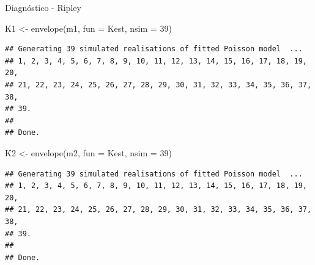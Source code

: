 \documentclass[
  11pt,
  ignorenonframetext,
]{beamer}
\newenvironment{Shaded}{}{}
\newcommand{\AttributeTok}[1]{\textcolor[rgb]{0.49,0.56,0.16}{#1}}
\newcommand{\DecValTok}[1]{\textcolor[rgb]{0.25,0.63,0.44}{#1}}
\newcommand{\FunctionTok}[1]{\textcolor[rgb]{0.02,0.16,0.49}{#1}}
\newcommand{\NormalTok}[1]{#1}
\newcommand{\OtherTok}[1]{\textcolor[rgb]{0.00,0.44,0.13}{#1}}
\begin{document}
\begin{frame}[fragile]{Diagnóstico - Ripley}
\protect\hypertarget{diagnuxf3stico---ripley}{}
\begin{Shaded}
\begin{Highlighting}[]
\NormalTok{K1 }\OtherTok{\textless{}{-}} \FunctionTok{envelope}\NormalTok{(m1, }\AttributeTok{fun =}\NormalTok{ Kest, }\AttributeTok{nsim =} \DecValTok{39}\NormalTok{)}
\end{Highlighting}
\end{Shaded}

\begin{verbatim}
## Generating 39 simulated realisations of fitted Poisson model  ...
## 1, 2, 3, 4, 5, 6, 7, 8, 9, 10, 11, 12, 13, 14, 15, 16, 17, 18, 19, 20,
## 21, 22, 23, 24, 25, 26, 27, 28, 29, 30, 31, 32, 33, 34, 35, 36, 37, 38, 
## 39.
## 
## Done.
\end{verbatim}

\begin{Shaded}
\begin{Highlighting}[]
\NormalTok{K2 }\OtherTok{\textless{}{-}} \FunctionTok{envelope}\NormalTok{(m2, }\AttributeTok{fun =}\NormalTok{ Kest, }\AttributeTok{nsim =} \DecValTok{39}\NormalTok{)}
\end{Highlighting}
\end{Shaded}

\begin{verbatim}
## Generating 39 simulated realisations of fitted Poisson model  ...
## 1, 2, 3, 4, 5, 6, 7, 8, 9, 10, 11, 12, 13, 14, 15, 16, 17, 18, 19, 20,
## 21, 22, 23, 24, 25, 26, 27, 28, 29, 30, 31, 32, 33, 34, 35, 36, 37, 38, 
## 39.
## 
## Done.
\end{verbatim}
\end{frame}
\end{document}
